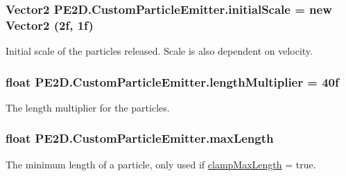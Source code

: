 \hypertarget{class_p_e2_d_1_1_custom_particle_emitter_a30b68ba2956245b5e75b81aee52ef0f1}{}
\subsubsection[{initial\+Scale}]{\setlength{\rightskip}{0pt plus 5cm}Vector2 P\+E2\+D.\+Custom\+Particle\+Emitter.\+initial\+Scale = new Vector2 (2f, 1f)}\label{class_p_e2_d_1_1_custom_particle_emitter_a30b68ba2956245b5e75b81aee52ef0f1}


Initial scale of the particles released. Scale is also dependent on velocity. 

\hypertarget{class_p_e2_d_1_1_custom_particle_emitter_aaf85215c89bfa7e36482394c042af95e}{}
\subsubsection[{length\+Multiplier}]{\setlength{\rightskip}{0pt plus 5cm}float P\+E2\+D.\+Custom\+Particle\+Emitter.\+length\+Multiplier = 40f}\label{class_p_e2_d_1_1_custom_particle_emitter_aaf85215c89bfa7e36482394c042af95e}


The length multiplier for the particles. 

\hypertarget{class_p_e2_d_1_1_custom_particle_emitter_a88aef32381d4e9931fe75769bde81beb}{}
\subsubsection[{max\+Length}]{\setlength{\rightskip}{0pt plus 5cm}float P\+E2\+D.\+Custom\+Particle\+Emitter.\+max\+Length}\label{class_p_e2_d_1_1_custom_particle_emitter_a88aef32381d4e9931fe75769bde81beb}


The minimum length of a particle, only used if \hyperlink{class_p_e2_d_1_1_custom_particle_emitter_a68678a550300ff27596c7d667df2d4f2}{clamp\+Max\+Length} = true. 

